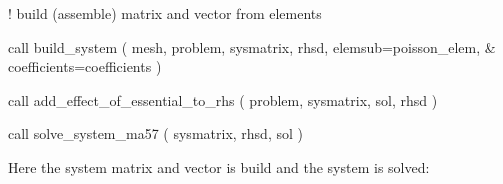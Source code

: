\begin{listingcont}
! build (assemble) matrix and vector from elements
                                                                                
  call build_system ( mesh, problem, sysmatrix, rhsd, elemsub=poisson_elem, &
    coefficients=coefficients )
                                                                                
  call add_effect_of_essential_to_rhs ( problem, sysmatrix, sol, rhsd )
                                                                                
  call solve_system_ma57 ( sysmatrix, rhsd, sol )
                                                                                
\end{listingcont}
Here the system matrix and vector is build and the system is solved:
